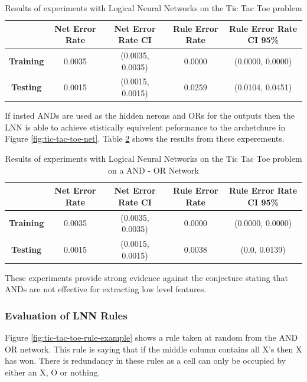 


\begin{table}[H]
	\begin{center}
		\begin{tabular}{| c | c | c | c | c |}
			\hline
			\textbf{} & \textbf{Net Error Rate} & \textbf{Net Error Rate CI} & \textbf{Rule Error Rate} & \textbf{Rule Error Rate CI 95\%}\\
			\hline
			\hline
			\textbf{Training} & 0.0035 & (0.0035, 0.0035) & 0.0000 & (0.0000, 0.0000)\\
			\textbf{Testing} & 0.0015 & (0.0015, 0.0015) & 0.0259 & (0.0104, 0.0451)\\
			\hline
		\end{tabular}
	\end{center}
	\caption{Results of experiments with Logical Neural Networks on the Tic Tac Toe problem}
	\label{tab:tic-tac-toe-lnn-peformance-results}
\end{table}

If insted ANDs are used as the hidden nerons and ORs for the outputs then the LNN is able to achieve stistically equivelent peformance to the archetchure in Figure \ref{fig:tic-tac-toe-net}. Table \ref{tab:tic-tac-toe-lnn-peformance-results-and-or} shows the results from these experements.

\begin{table}[H]
	\begin{center}
		\begin{tabular}{| c | c | c | c | c |}
			\hline
			\textbf{} & \textbf{Net Error Rate} & \textbf{Net Error Rate CI} & \textbf{Rule Error Rate} & \textbf{Rule Error Rate CI 95\%}\\
			\hline
			\hline
			\textbf{Training} & 0.0035 & (0.0035, 0.0035) & 0.0000 & (0.0000, 0.0000)\\
			\textbf{Testing} & 0.0015 & (0.0015, 0.0015) & 0.0038 & (0.0, 0.0139)\\
			\hline
		\end{tabular}
	\end{center}
	\caption{Results of experiments with Logical Neural Networks on the Tic Tac Toe problem on a AND - OR Network}
	\label{tab:tic-tac-toe-lnn-peformance-results-and-or}
\end{table}

These experiments provide strong evidence against the conjecture stating that ANDs are not effective for extracting low level features.

\subsubsection{Evaluation of LNN Rules}
Figure \ref{fig:tic-tac-toe-rule-example} shows a rule taken at random from the AND OR network. This rule is saying that if the middle column contains all X's then X has won. There is redundancy in these rules as a cell can only be occupied by either an X, O or nothing.

